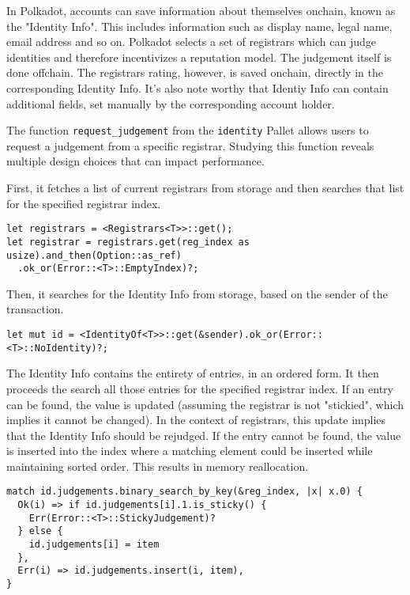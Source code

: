 \documentclass[11pt,a4paper]{article}
\begin{document}
In Polkadot, accounts can save information about themselves onchain, known as the "Identity Info".
This includes information such as display name, legal name, email address and so on. Polkadot selects
a set of registrars which can judge identities and therefore incentivizes a reputation model. The judgement itself
is done offchain. The registrars rating, however, is saved onchain, directly in the corresponding 
Identity Info. It's also note worthy that Identiy Info can contain additional fields, set manually by
the corresponding account holder.
\newline

The function \verb|request_judgement| from the \verb|identity| Pallet allows users to request a judgement
from a specific registrar. Studying this function reveals multiple design choices that can impact performance.
\newline

First, it fetches a list of current registrars from storage and then searches that list for the specified
registrar index.

\begin{verbatim}
let registrars = <Registrars<T>>::get();
let registrar = registrars.get(reg_index as usize).and_then(Option::as_ref)
  .ok_or(Error::<T>::EmptyIndex)?;
\end{verbatim}

Then, it searches for the Identity Info from storage, based on the sender of the transaction.

\begin{verbatim}
let mut id = <IdentityOf<T>>::get(&sender).ok_or(Error::<T>::NoIdentity)?;
\end{verbatim}

The Identity Info contains the entirety of entries, in an ordered form. It then proceeds the search all
those entries for the specified registrar index. If an entry can be found, the value is updated
(assuming the registrar is not "stickied", which implies it cannot be changed). In the context of registrars,
this update implies that the Identity Info should be rejudged. If the entry cannot 
be found, the value is inserted into the index where a matching element could be inserted while maintaining
sorted order. This results in memory reallocation.
\newpage

\begin{verbatim}
match id.judgements.binary_search_by_key(&reg_index, |x| x.0) {
  Ok(i) => if id.judgements[i].1.is_sticky() {
    Err(Error::<T>::StickyJudgement)?
  } else {
    id.judgements[i] = item
  },
  Err(i) => id.judgements.insert(i, item),
}
\end{verbatim}
\end{document}
